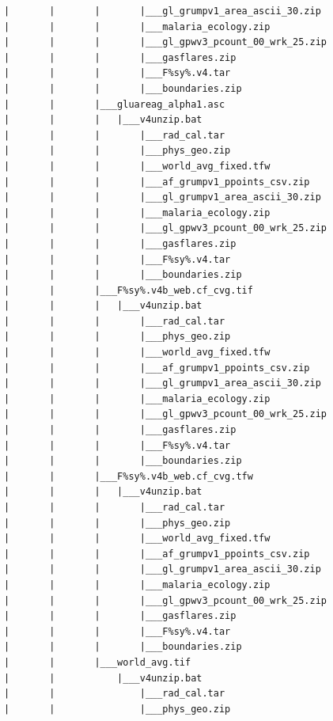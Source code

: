 \documentclass[]{book}
\begin{document}
\begin{verbatim}
            |       |       |       |___gl_grumpv1_area_ascii_30.zip
            |       |       |       |___malaria_ecology.zip
            |       |       |       |___gl_gpwv3_pcount_00_wrk_25.zip
            |       |       |       |___gasflares.zip
            |       |       |       |___F%sy%.v4.tar
            |       |       |       |___boundaries.zip
            |       |       |___gluareag_alpha1.asc
            |       |       |   |___v4unzip.bat
            |       |       |       |___rad_cal.tar
            |       |       |       |___phys_geo.zip
            |       |       |       |___world_avg_fixed.tfw
            |       |       |       |___af_grumpv1_ppoints_csv.zip
            |       |       |       |___gl_grumpv1_area_ascii_30.zip
            |       |       |       |___malaria_ecology.zip
            |       |       |       |___gl_gpwv3_pcount_00_wrk_25.zip
            |       |       |       |___gasflares.zip
            |       |       |       |___F%sy%.v4.tar
            |       |       |       |___boundaries.zip
            |       |       |___F%sy%.v4b_web.cf_cvg.tif
            |       |       |   |___v4unzip.bat
            |       |       |       |___rad_cal.tar
            |       |       |       |___phys_geo.zip
            |       |       |       |___world_avg_fixed.tfw
            |       |       |       |___af_grumpv1_ppoints_csv.zip
            |       |       |       |___gl_grumpv1_area_ascii_30.zip
            |       |       |       |___malaria_ecology.zip
            |       |       |       |___gl_gpwv3_pcount_00_wrk_25.zip
            |       |       |       |___gasflares.zip
            |       |       |       |___F%sy%.v4.tar
            |       |       |       |___boundaries.zip
            |       |       |___F%sy%.v4b_web.cf_cvg.tfw
            |       |       |   |___v4unzip.bat
            |       |       |       |___rad_cal.tar
            |       |       |       |___phys_geo.zip
            |       |       |       |___world_avg_fixed.tfw
            |       |       |       |___af_grumpv1_ppoints_csv.zip
            |       |       |       |___gl_grumpv1_area_ascii_30.zip
            |       |       |       |___malaria_ecology.zip
            |       |       |       |___gl_gpwv3_pcount_00_wrk_25.zip
            |       |       |       |___gasflares.zip
            |       |       |       |___F%sy%.v4.tar
            |       |       |       |___boundaries.zip
            |       |       |___world_avg.tif
            |       |           |___v4unzip.bat
            |       |               |___rad_cal.tar
            |       |               |___phys_geo.zip

\end{verbatim}
\end{document}

